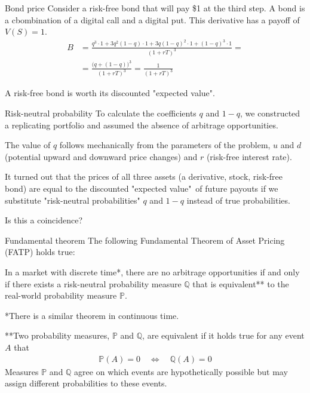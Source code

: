 \documentclass{beamer}
\begin{document}
\begin{frame}{Bond price}
\justify
Consider a risk-free bond that will pay \$1 at the third step. A bond is a cbombination of a digital call and a digital put. This derivative has a payoff of $V(S) = 1$.
\begin{align*}
B &= \frac{q^3 \cdot 1 + 3q^2(1-q) \cdot 1 + 3q(1-q)^2 \cdot 1 + (1-q)^3 \cdot 1}{(1+rT)^3} = \\
&= \frac{\Big(q + (1-q) \Big)^3}{(1+rT)^3} = \frac{1}{(1+rT)^3}
\end{align*}

\justify
A risk-free bond is worth its discounted "expected value".
\end{frame}



\begin{frame}{Risk-neutral probability}
\justify
To calculate the coefficients $q$ and $1-q$, we constructed a replicating portfolio and assumed the absence of arbitrage opportunities.

\justify
The value of $q$ follows mechanically from the parameters of the problem, $u$ and $d$ (potential upward and downward price changes) and $r$ (risk-free interest rate).

\justify
It turned out that the prices of all three assets (a derivative, stock, risk-free bond) are equal to the discounted "expected value"\ of future payouts if we substitute "risk-neutral probabilities" $q$ and $1-q$ instead of true probabilities.

\justify
Is this a coincidence?
\end{frame}



\begin{frame}{Fundamental theorem}
\justify
The following \alert{Fundamental Theorem of Asset Pricing (FATP)} holds true:

\justify
In a market with discrete time*, there are no arbitrage opportunities if and only if there exists a risk-neutral probability measure $\mathbb{Q}$ that is equivalent** to the real-world probability measure $\mathbb{P}$.

\justify
*There is a similar theorem in continuous time.

\justify
**Two probability measures, $\mathbb{P}$ and $\mathbb{Q}$, are equivalent if it holds true for any event $A$ that 
\begin{align*}
\mathbb{P}(A)=0 \quad \Leftrightarrow \quad \mathbb{Q}(A)=0
\end{align*}
Measures $\mathbb{P}$ and $\mathbb{Q}$ agree on which events are hypothetically possible but may assign different probabilities to these events.
\end{frame}
\end{document}
